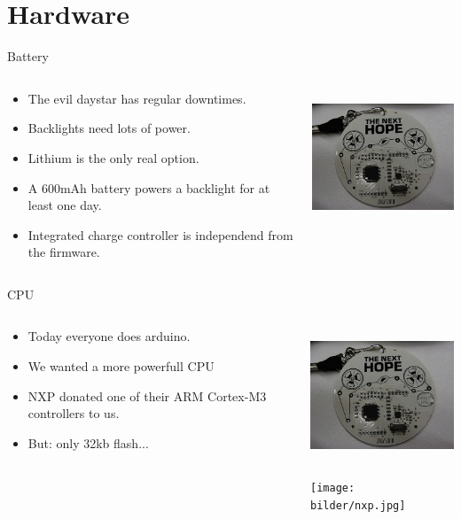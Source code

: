 \documentclass{beamer}
\begin{document}
\section{Hardware}
\begin{frame}{Battery}
  \begin{columns}
    \begin{column}{6cm}
        \begin{itemize}
		\item The evil daystar has regular downtimes.
		\item Backlights need lots of power.
		\item Lithium is the only real option.
		\item A 600mAh battery powers a backlight for at least one day.
		\item Integrated charge controller is independend from the firmware.
	\end{itemize}
    \end{column}
    \begin{column}{6cm}
        \includegraphics[height=4cm]{bilder/battery.jpg}
    \end{column}
  \end{columns}
\end{frame}
\begin{frame}{CPU}
  \begin{columns}
    \begin{column}{6cm}
        \begin{itemize}
		\item Today everyone does arduino.
		\item We wanted a more powerfull CPU
		\item NXP donated one of their ARM Cortex-M3 controllers to us.
		\item But: only 32kb flash...
	\end{itemize}
    \end{column}
    \begin{column}{6cm}
        \includegraphics[height=4cm]{bilder/cpu.jpg}

        \texttt{[image: bilder/nxp.jpg]}
    \end{column}
  \end{columns}
\end{frame}
\end{document}
